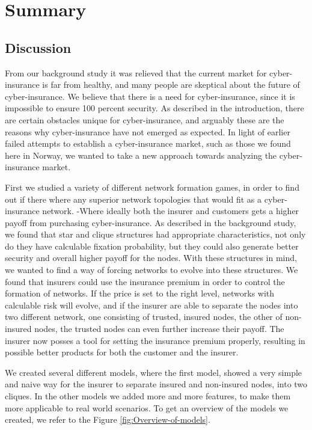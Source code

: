 

\chapter{Summary}
\section{Discussion}
From our background study it was relieved that the current market for cyber-insurance is far from healthy, and many people are skeptical about the future of cyber-insurance. We believe that there is a need for cyber-insurance, since it is impossible to ensure 100 percent security. As described in the introduction, there are certain obstacles unique for cyber-insurance, and arguably these are the reasons why cyber-insurance have not emerged as expected. In light of earlier failed attempts to establish a cyber-insurance market, such as those we found here in Norway, we wanted to take a new approach towards analyzing the cyber-insurance market. 

First we studied a variety of different network formation games, in order to find out if there where any superior network topologies that would fit as a cyber-insurance network. -Where ideally both the insurer and customers gets a higher payoff from purchasing cyber-insurance. As described in the background study, we found that star and clique structures had appropriate characteristics, not only do they have calculable fixation probability, but they could also generate better security and overall higher payoff for the nodes. With these structures in mind, we wanted to find a way of forcing networks to evolve into these structures.  We found that insurers could use the insurance premium in order to control the formation of networks. If the price is set to the right level, networks with calculable risk will evolve, and if the insurer are able to separate the nodes into two different network, one consisting of trusted, insured nodes, the other of non-insured nodes, the trusted nodes can even further increase their payoff. The insurer now posses a tool for setting the insurance premium properly, resulting in possible better products for both the customer and the insurer.

We created several different models, where the first model, showed a very simple and naive way for the insurer to separate insured and non-insured nodes, into two cliques. In the other models we added more and more features, to make them more applicable to real world scenarios. To get an overview of the models we created, we refer to the Figure \ref{fig:Overview-of-models}. 

